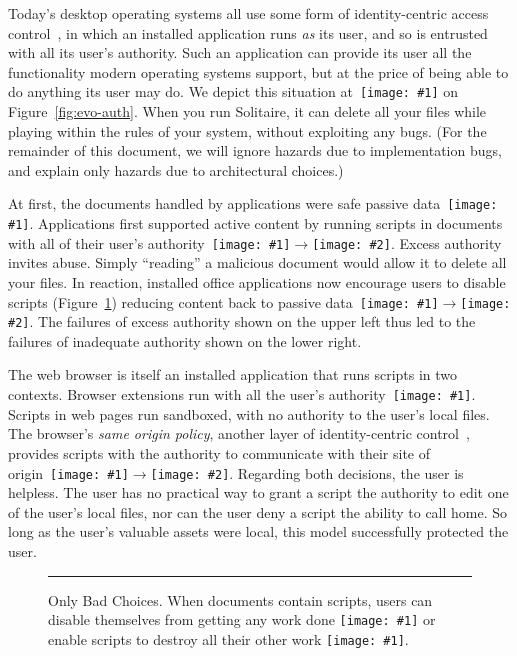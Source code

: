 \documentclass[letterpaper,twocolumn,10pt]{article}
\newcommand{\q}[1]{{\texttt{[image: \#1]}}}
\newcommand{\qq}[2]{{\texttt{[image: \#1]}}$\rightarrow${\texttt{[image: \#2]}}}
\begin{document}
Today's desktop operating systems all use some form of identity-centric 
access control~\cite{karp:abac-soa}, in which an installed application runs 
\emph{as} its user, and so is entrusted with all its user's authority. Such 
an application can provide its user all the functionality modern operating 
systems support, but at the price of being able to do anything its user may 
do. We depict this situation at~\q{2} on Figure~\ref{fig:evo-auth}. When you 
run Solitaire, it can delete all your files while playing within the rules of 
your system, without exploiting any bugs. (For the remainder of this 
document, we will ignore hazards due to implementation bugs, and explain only 
hazards due to architectural choices.)

At first, the documents handled by applications were safe passive data~\q{1}. 
Applications first supported active content by running scripts in documents 
with all of their user's authority~\qq{1}{2}. Excess authority invites abuse. 
Simply ``reading'' a malicious document would allow it to delete all your 
files. In reaction, installed office applications now encourage users to 
disable scripts (Figure~\ref{fig:dialog}) reducing content back to passive 
data~\qq{2}{1}. The failures of excess authority shown on the upper left thus 
led to the failures of inadequate authority shown on the lower right.

The web browser is itself an installed application that runs scripts in two 
contexts. Browser extensions run with all the user's authority~\q{2}. Scripts 
in web pages run sandboxed, with no authority to the user's local files. The 
browser's \emph{same origin policy}, another layer of identity-centric 
control~\cite{mashupos}, provides scripts with the authority to communicate 
with their site of origin~\qq{1}{3}. Regarding both decisions, the user is 
helpless. The user has no practical way to grant a script the authority to 
edit one of the user's local files, nor can the user deny a script the 
ability to call home. So long as the user's valuable assets were local, this 
model successfully protected the user.

\begin{figure}[t!]
  
\caption[Only Bad Choices.]{Only Bad Choices. When documents contain scripts, 
users can disable themselves from getting any work done \q{1} or enable 
scripts to destroy all their other work \q{2}. \\ } \hrule
  \label{fig:dialog}
\end{figure}
\end{document}
